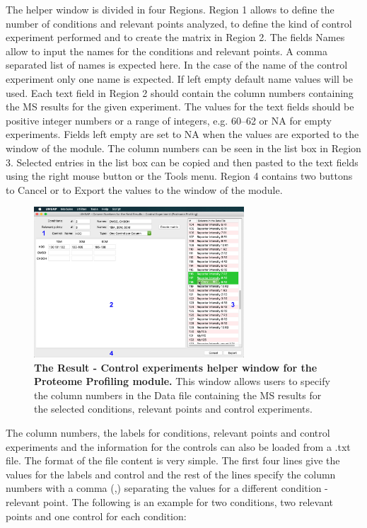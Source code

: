 The helper window is divided in four Regions. Region \num{1} allows to define the number of conditions and relevant points analyzed, to define the kind of control experiment performed and to create the matrix in Region \num{2}. The fields Names allow to input the names for the conditions and relevant points. A comma separated list of names is expected here. In the case of the name of the control experiment only one name is expected. If left empty default name values will be used. Each text field in Region \num{2} should contain the column numbers containing the MS results for the given experiment. The values for the text fields should be positive integer numbers or a range of integers, e.g. \numrange[range-phrase=--]{60}{62} or NA for empty experiments. Fields left empty are set to NA when the values are exported to the window of the module. The column numbers can be seen in the list box in Region \num{3}. Selected entries in the list box can be copied and then pasted to the text fields using the right mouse button or the Tools menu. Region \num{4} contains two buttons to Cancel or to Export the values to the window of the module.  

\begin{figure}[h]
	\centering
	\includegraphics[width=0.7\textwidth]{./IMAGES/MOD-PROTPROF/protprof-rescontrol.jpg}
	\caption[The Result - Control experiments helper window for the Proteome Profiling module]{\textbf{The Result - Control experiments helper window for the Proteome Profiling module.} This window allows users to specify the column numbers in the Data file containing the MS results for the selected conditions, relevant points and control experiments.} 
	\label{fig:protprofResControlWindow}
	\vspace{-5pt} 	
\end{figure}

The column numbers, the labels for conditions, relevant points and control experiments and the information for the controls can also be loaded from a .txt file. The format of the file content is very simple. The first four lines give the values for the labels and control and the rest of the lines specify the column numbers with a comma (,) separating the values for a different condition - relevant point. The following is an example for two conditions, two relevant points and one control for each condition:

